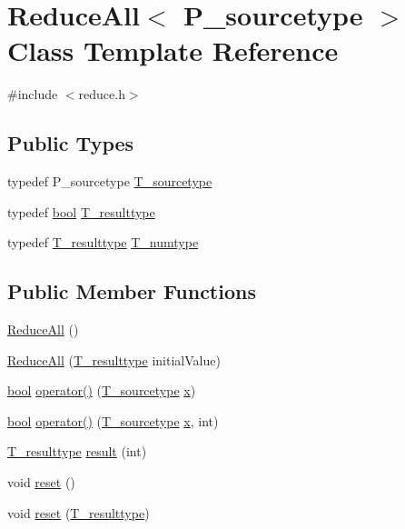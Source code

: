 \hypertarget{classReduceAll}{}\section{Reduce\+All$<$ P\+\_\+sourcetype $>$ Class Template Reference}
\label{classReduceAll}


{\ttfamily \#include $<$reduce.\+h$>$}

\subsection*{Public Types}
\begin{DoxyCompactItemize}
\item 
typedef P\+\_\+sourcetype \hyperlink{classReduceAll_a3aa5bceb735aa17176eb9906a8648e33}{T\+\_\+sourcetype}
\item 
typedef \hyperlink{compiler_8h_abb452686968e48b67397da5f97445f5b}{bool} \hyperlink{classReduceAll_a002a37d5068dee35a2e7aa99f51534c8}{T\+\_\+resulttype}
\item 
typedef \hyperlink{classReduceAll_a002a37d5068dee35a2e7aa99f51534c8}{T\+\_\+resulttype} \hyperlink{classReduceAll_a9ffb6c80449a64513a350fde7be01e25}{T\+\_\+numtype}
\end{DoxyCompactItemize}
\subsection*{Public Member Functions}
\begin{DoxyCompactItemize}
\item 
\hyperlink{classReduceAll_affd826b420156aff40c8e65eb3c95dc7}{Reduce\+All} ()
\item 
\hyperlink{classReduceAll_accc45b0a3329f8e039c3e98d21ac5054}{Reduce\+All} (\hyperlink{classReduceAll_a002a37d5068dee35a2e7aa99f51534c8}{T\+\_\+resulttype} initial\+Value)
\item 
\hyperlink{compiler_8h_abb452686968e48b67397da5f97445f5b}{bool} \hyperlink{classReduceAll_a47a083f98944d83c4536ea0b12c00f76}{operator()} (\hyperlink{classReduceAll_a3aa5bceb735aa17176eb9906a8648e33}{T\+\_\+sourcetype} \hyperlink{vecnorm1_8cc_ac73eed9e41ec09d58f112f06c2d6cb63}{x})
\item 
\hyperlink{compiler_8h_abb452686968e48b67397da5f97445f5b}{bool} \hyperlink{classReduceAll_a1f57572f62569fa10348d30633be2d6b}{operator()} (\hyperlink{classReduceAll_a3aa5bceb735aa17176eb9906a8648e33}{T\+\_\+sourcetype} \hyperlink{vecnorm1_8cc_ac73eed9e41ec09d58f112f06c2d6cb63}{x}, int)
\item 
\hyperlink{classReduceAll_a002a37d5068dee35a2e7aa99f51534c8}{T\+\_\+resulttype} \hyperlink{classReduceAll_a5846fd369da02ca68f07cfe148a80939}{result} (int)
\item 
void \hyperlink{classReduceAll_a01fe07073e2c68bd9112ec198533eec7}{reset} ()
\item 
void \hyperlink{classReduceAll_a0b5367a1b651a90b9ef1192ae79874c0}{reset} (\hyperlink{classReduceAll_a002a37d5068dee35a2e7aa99f51534c8}{T\+\_\+resulttype})
\end{DoxyCompactItemize}
